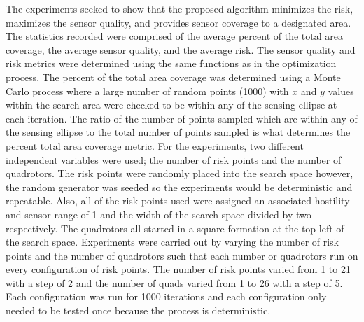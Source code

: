 \documentclass[12pt]{article}
\begin{document}
The experiments seeked to show that the proposed algorithm minimizes the risk,
maximizes the sensor quality, and provides sensor coverage to a designated
area. The statistics recorded were comprised of the average percent of the
total area coverage, the average sensor quality, and the average risk. The
sensor quality and risk metrics were determined using the same functions as in
the optimization process. The percent of the total area coverage was determined
using a Monte Carlo process where a large number of random points (1000) with
$x$ and $y$ values within the search area were checked to be within any of the
sensing ellipse at each iteration. The ratio of the number of points sampled
which are within any of the sensing ellipse to the total number of points
sampled is what determines the percent total area coverage metric. For the
experiments, two different independent variables were used; the number of risk
points and the number of quadrotors. The risk points were randomly placed into
the search space however, the random generator was seeded so the experiments
would be deterministic and repeatable. Also, all of the risk points used were
assigned an associated hostility and sensor range of 1 and the width of the
search space divided by two respectively. The quadrotors all started in a
square formation at the top left of the search space. Experiments were carried
out by varying the number of risk points and the number of quadrotors such that
each number or quadrotors run on every configuration of risk points. The number
of risk points varied from 1 to 21 with a step of 2 and the number of quads
varied from 1 to 26 with a step of 5. Each configuration was run for 1000
iterations and each configuration only needed to be tested once because the
process is deterministic. 
\end{document}
